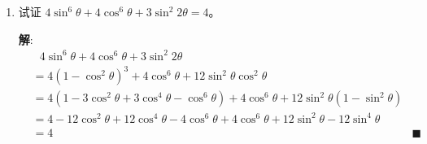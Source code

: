 \documentclass{report}
\newcommand{\sol}{\vspace{0.2cm}\textbf{解}:}
\begin{document}
\begin{enumerate}[leftmargin=*]
        \sol{}
        \begin{align*}
            L.H.S. = \sin 3\theta &= \sin(2\theta + \theta)\\
            & = \sin 2\theta \cos \theta + \cos 2\theta \sin \theta\\
            & = 2\sin\theta\cos^2\theta + (1-2\sin^2\theta)\sin\theta\\
            & = 2\sin\theta(1-\sin^2\theta) + \sin\theta - 2\sin^3\theta\\
            & = 2\sin\theta - 2\sin^3\theta + \sin\theta - 2\sin^3\theta\\
            & = 3\sin\theta - 4\sin^3\theta\\
            R.H.S. = 4\sin\theta\sin\left(60^{\circ}+\theta\right)\sin\left(60^{\circ}-\theta\right) &= 4\sin\theta\left(\dfrac{\sqrt{3}}{2}\cos\theta + \dfrac{1}{2}\sin\theta\right)\left(\dfrac{\sqrt{3}}{2}\cos\theta - \dfrac{1}{2}\sin\theta\right)\\
            &= 4\sin\theta\left(\dfrac{3}{4}\cos^2\theta - \dfrac{1}{4}\sin^2\theta\right)\\
            & = 3\sin\theta\cos^2\theta - \sin^3\theta\\
            & = 3\sin\theta(1-\sin^2\theta) - \sin^3\theta\\
            & = 3\sin\theta - 3\sin^3\theta - \sin^3\theta\\
            & = 3\sin\theta - 4\sin^3\theta
        \end{align*}
        $\because L.H.S. = R.H.S.$, hence proved. \hfill $\blacksquare$
                
        \item 试证 $4 \sin ^6 \theta+4 \cos ^6 \theta+3 \sin ^2 2 \theta=4$。
        
        \sol{}
        \begin{align*}
            &\ \ \ 4 \sin ^6 \theta+4 \cos ^6 \theta+3 \sin ^2 2 \theta\\
            &= 4(1-\cos^2\theta)^3 + 4\cos^6\theta + 12\sin^2\theta\cos^2\theta\\
            &= 4(1-3\cos^2\theta + 3\cos^4\theta - \cos^6\theta) + 4\cos^6\theta + 12\sin^2\theta(1-\sin^2\theta)\\
            &= 4 - 12\cos^2\theta + 12\cos^4\theta - 4\cos^6\theta + 4\cos^6\theta + 12\sin^2\theta - 12\sin^4\theta\\
            &= 4 & \blacksquare
        \end{align*}
        

\end{enumerate}
\end{document}
